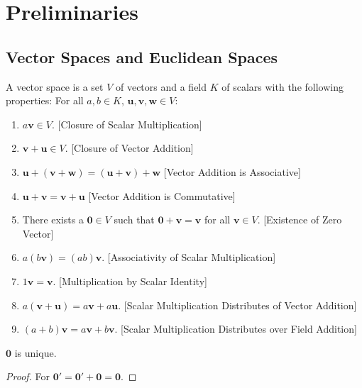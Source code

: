 \documentclass[crop=false,class=article,oneside]{standalone}
\begin{document}
    \ifx\ifworkmasterswork\undefined
        \section*{Preliminaries}
        \setcounter{section}{1}
    \fi
    \subsection{Vector Spaces and Euclidean Spaces}
        \begin{definition}
        A vector space is a set $V$ of vectors and a field $K$ of scalars with the following properties: For all $a,b\in K$, $\mathbf{u,v,w}\in V$:
        \begin{enumerate}
            \item $a\mathbf{v} \in V$. \hfill [Closure of Scalar Multiplication]
            \item $\mathbf{v}+\mathbf{u} \in V$. \hfill [Closure of Vector Addition]
            \item $\mathbf{u}+(\mathbf{v}+\mathbf{w}) = (\mathbf{u}+\mathbf{v})+\mathbf{w}$ \hfill [Vector Addition is Associative]
            \item $\mathbf{u}+\mathbf{v}=\mathbf{v}+\mathbf{u}$ \hfill [Vector Addition is Commutative]
            \item There exists a $\mathbf{0}\in V$ such that $\mathbf{0}+\mathbf{v}=\mathbf{v}$ for all $\mathbf{v}\in V$. \hfill [Existence of Zero Vector]
            \item $a(b\mathbf{v}) = (ab)\mathbf{v}$. \hfill [Associativity of Scalar Multiplication]
            \item $1 \mathbf{v} = \mathbf{v}$. \hfill[Multiplication by Scalar Identity]
            \item $a(\mathbf{v}+\mathbf{u}) = a\mathbf{v}+a\mathbf{u}$. \hfill [Scalar Multiplication Distributes of Vector Addition]
            \item $(a+b)\mathbf{v}= a\mathbf{v}+b\mathbf{v}$. \hfill [Scalar Multiplication Distributes over Field Addition]
        \end{enumerate}
        \end{definition}
        \begin{theorem}
        $\mathbf{0}$ is unique.
        \end{theorem}
        \begin{proof}
        For $\mathbf{0}'=\mathbf{0}'+\mathbf{0}=\mathbf{0}$.
        \end{proof}
\end{document}
